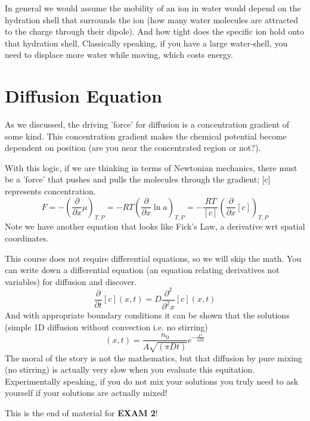 \documentclass{article}
\newcommand{\be}{\begin{equation}}
\newcommand{\ee}{\end{equation}}
\newcommand{\pd}{\partial}
\begin{document}
In general we would assume the mobility of an ion in water would depend on the hydration shell that surrounds the ion (how many water molecules are attracted to the charge through their dipole). 
And how tight does the specific ion hold onto that hydration shell. 
Classically speaking, if you have a large water-shell, you need to displace more water while moving, which costs energy. 

\section*{Diffusion Equation}
As we discussed, the driving 'force' for diffusion is a concentration gradient of some kind. 
This concentration gradient makes the chemical potential become dependent on position (are you near the concentrated region or not?).

With this logic, if we are thinking in terms of  Newtonian mechanics, there must be a 'force' that pushes and pulls the molecules through the gradient; [c] represents concentration.
\be
F = -\left(\frac{\pd}{\pd x}\mu\right)_{T,P} = -RT\left(\frac{\pd}{\pd x}\ln a\right)_{T,P} = -\frac{RT}{[c]}\left(\frac{\pd}{\pd x}[c]\right)_{T,P} 
\ee
Note we have another equation that looks like Fick's Law, a derivative wrt spatial coordinates. 

This course does not require differential equations, so we will skip the math. 
You can write down a differential equation (an equation relating derivatives not variables) for diffusion and discover. 
\be
\frac{\pd}{\pd t}[c](x,t) = D\frac{\pd^2}{\pd^2x}[c](x,t)
\ee
And with appropriate boundary conditions it can be shown that the solutions (simple 1D diffusion without convection i.e. no stirring)
\be
[c](x,t) = \frac{n_0}{A\sqrt{(\pi Dt)}}e^{-\frac{x^2}{4Dt}}
\ee
The moral of the story is not the mathematics, but that diffusion by pure mixing (no stirring) is actually very slow when you evaluate this equitation. 
Experimentally speaking, if you do not mix your solutions you truly need to ask yourself if your solutions are actually mixed!

This is the end of material for \textbf{EXAM 2}!
\end{document}
